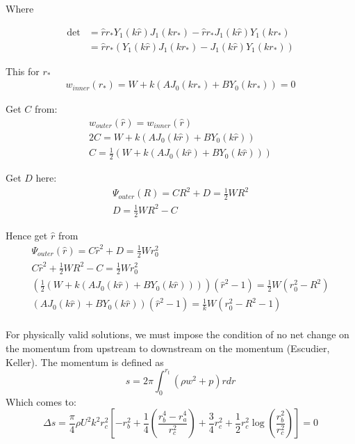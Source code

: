 \documentclass{X:/Documents/Coding/Latex/myreport}
\begin{document}
Where

\begin{align*}
\det &= \hat{r}r_* Y_1(k\hat{r})J_1(kr_*) - \hat{r}r_* J_1(k\hat{r}) Y_1(kr_*)\\
&= \hat{r}r_*\left(Y_1(k\hat{r})J_1(kr_*) -  J_1(k\hat{r}) Y_1(kr_*)\right)
\end{align*}

This for $r_*$
\begin{align*}
    w_{inner}(r_*) = W + k(AJ_0(kr_*) + BY_0(kr_*)) =0
\end{align*}

Get $C$ from:
\begin{align*}
    w_{outer}(\hat{r}) = w_{inner}(\hat{r})\\
    2C = W + k(AJ_0(k\hat{r}) + BY_0(k\hat{r}))\\
    C = \frac12\left(W + k(AJ_0(k\hat{r}) + BY_0(k\hat{r}))\right)
\end{align*}

Get $D$ here:
\begin{align*}
    \Psi_{outer}(R) = CR^2 + D = \frac12 WR^2\\
    D = \frac12 WR^2 - C
\end{align*}

Hence get $\hat{r}$ from 
\begin{align*}
    \Psi_{outer}(\hat{r}) = C\hat{r}^2 + D = \frac12 Wr_0^2\\
    C\hat{r}^2 + \frac12 WR^2 -C = \frac12 Wr_0^2\\
    \left(\frac12\left(W + k(AJ_0(k\hat{r}) + BY_0(k\hat{r}))\right)\right) (\hat{r}^2 - 1) = \frac12W(r_0^2 - R^2)\\
    \left(AJ_0(k\hat{r}) + BY_0(k\hat{r})\right)(\hat{r}^2 - 1) =\frac1{k}W(r_0^2 - R^2 -1)\\
\end{align*}




For physically valid solutions, we must impose the condition of no net change on the momentum from upstream to downstream  on the momentum (Escudier, Keller). The momentum is defined as
\[s = 2\pi \int_0^{r_t} \left(\rho w^2 + p\right) rdr\]
Which comes to:
\[\Delta s = \frac{\pi}{4} \rho U^2 k^2 r_c^2 \left[-r_b^2 + \frac14 \left(\frac{r_b^4 - r_a^4}{r_c^2}\right) + \frac34 r_c^2 + \frac12 r_c^2 \log \left(\frac{r_b^2}{r_c^2}\right)\right] = 0\]
\end{document}
